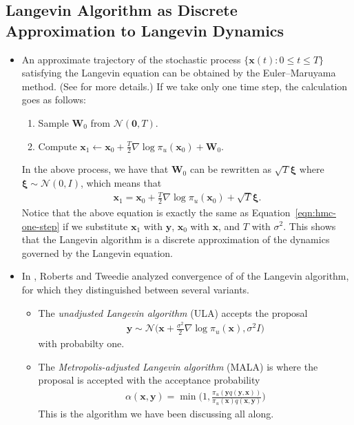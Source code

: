 \documentclass[10pt]{article}
\newcommand{\ve}[1]{\mathbf{#1}}
\newcommand{\ves}[1]{\boldsymbol{#1}}
\newcommand{\mcal}[1]{\mathcal{#1}}
\begin{document}
\subsection{Langevin Algorithm as Discrete Approximation to Langevin Dynamics}
\begin{itemize}
  \item An approximate trajectory of the stochastic process $\{ \ve{x}(t) : 0 \leq t \leq T \}$ satisfying the Langevin equation can be obtained by the Euler--Maruyama method. (See \cite{Khungurn:2022b} for more details.) If we take only one time step, the calculation goes as follows:
  \begin{enumerate}
    \item Sample $\ve{W}_0$ from $\mcal{N}(\ve{0}, T)$.
    \item Compute $\ve{x}_1 \gets \ve{x}_0 + \frac{T}{2} \nabla \log \pi_u(\ve{x}_0) + \ve{W}_0$.
  \end{enumerate}
  In the above process, we have that $\ve{W}_0$ can be rewritten as $\sqrt{T} \ves{\xi}$ where $\ves{\xi} \sim \mcal{N}(0, I)$, which means that
  \begin{align*}
    \ve{x}_1 = \ve{x}_0 + \frac{T}{2} \nabla \log \pi_u(\ve{x}_0) + \sqrt{T} \ves{\xi}.
  \end{align*} 
  Notice that the above equation is exactly the same as Equation~\eqref{eqn:hmc-one-step} if we substitute $\ve{x}_1$ with $\ve{y}$, $\ve{x}_0$ with $\ve{x}$, and $T$ with $\sigma^2$. This shows that the Langevin algorithm is a discrete approximation of the dynamics governed by the Langevin equation.

  \item In \cite{Roberts:1996}, Roberts and Tweedie analyzed convergence of of the Langevin algorithm, for which they distinguished between several variants.
  \begin{itemize}
    \item The {\it unadjusted Langevin algorithm} (ULA) accepts the proposal
    \begin{align*}
      \ve{y} \sim \mcal{N}\bigg( \ve{x} + \frac{\sigma^2}{2} \nabla \log \pi_u(\ve{x}), \sigma^2 I \bigg)
    \end{align*}
    with probabilty one.

    \item The {\it Metropolis-adjusted Langevin algorithm} (MALA) is where the proposal is accepted with the acceptance probability
    \begin{align*}
      \alpha(\ve{x},\ve{y}) = \min\bigg(1, \frac{\pi_u(\ve{y}q(\ve{y},\ve{x}))}{\pi_u(\ve{x})q(\ve{x},\ve{y})} \bigg)
    \end{align*}
    This is the algorithm we have been discussing all along.


\end{itemize}
\end{itemize}
\end{document}
